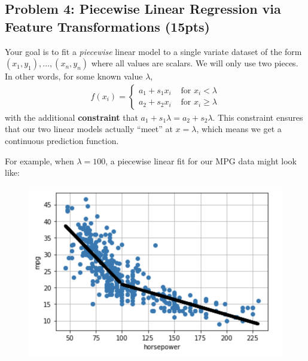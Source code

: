 \documentclass[10pt]{article}
\begin{document}
\subsection{Problem 4: Piecewise Linear Regression via Feature Transformations (15pts)}
Your goal is to fit a \emph{piecewise} linear model to a single variate dataset of the form $(x_1, y_1), \ldots, (x_n, y_n)$ where all values are scalars. We will only use two pieces. In other words, for some known value $\lambda$, 
\begin{align*}
f(x_i) = \begin{cases}
a_1 + s_1x_i & \text{ for $x_i < \lambda$}\\ 
a_2 + s_2x_i & \text{ for $x_i \geq \lambda$}
\end{cases}
\end{align*}
with the additional \textbf{constraint} that $a_1 + s_1\lambda = a_2 + s_2\lambda$. This constraint ensures that our two linear models actually ``meet'' at $x = \lambda$, which means we get a continuous prediction function.

For example, when $\lambda = 100$, a piecewise linear fit for our MPG data might look like:
\begin{figure}[H]
	\centering
	\includegraphics[width=.4\textwidth]{piecewise_fit.png} 
\end{figure}
\end{document}
